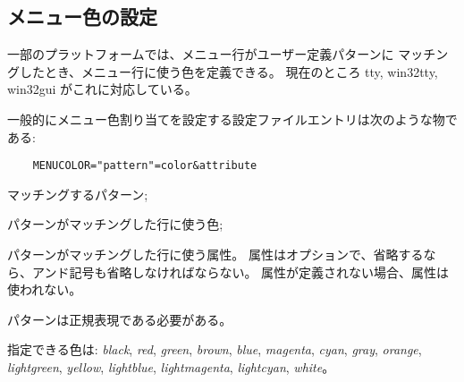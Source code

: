 
\subsection*{メニュー色の設定}

一部のプラットフォームでは、メニュー行がユーザー定義パターンに
マッチングしたとき、メニュー行に使う色を定義できる。
現在のところ tty, win32tty, win32gui がこれに対応している。

一般的にメニュー色割り当てを設定する設定ファイルエントリは次のような物である:
\begin{verbatim}
    MENUCOLOR="pattern"=color&attribute
\end{verbatim}

\blist{}
\item[\ib{pattern}]
マッチングするパターン;
\item[\ib{color}]
パターンがマッチングした行に使う色;
\item[\ib{attribute}]
パターンがマッチングした行に使う属性。
属性はオプションで、省略するなら、アンド記号も省略しなければならない。
属性が定義されない場合、属性は使われない。
\elist

パターンは正規表現である必要がある。

指定できる色は:
{\it black}, {\it red}, {\it green}, {\it brown},
{\it blue}, {\it magenta}, {\it cyan}, {\it gray}, {\it orange},
{\it lightgreen}, {\it yellow}, {\it lightblue}, {\it lightmagenta},
{\it lightcyan}, {\it white}。

